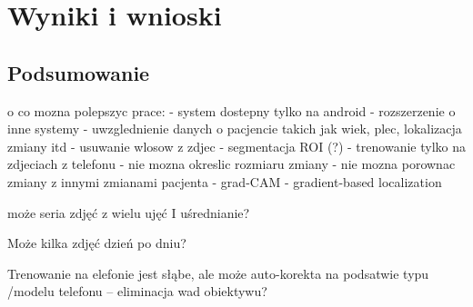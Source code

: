 
\def\filename{rozdzial5}
\chapter{Wyniki i wnioski}

\section{Podsumowanie}


o co mozna polepszyc prace:
- system dostepny tylko na android - rozszerzenie o inne systemy
- uwzglednienie danych o pacjencie takich jak wiek, plec, lokalizacja zmiany itd
- usuwanie wlosow z zdjec
- segmentacja ROI (?)
- trenowanie tylko na zdjeciach z telefonu
- nie mozna okreslic rozmiaru zmiany
- nie mozna porownac zmiany z innymi zmianami pacjenta
- grad-CAM - gradient-based localization

może seria zdjęć z wielu ujęć I uśrednianie?

Może kilka zdjęć dzień po dniu?

Trenowanie na elefonie jest słąbe, ale może auto-korekta na podsatwie typu /modelu telefonu – eliminacja wad obiektywu?
